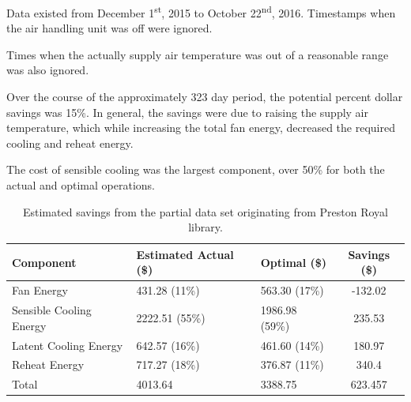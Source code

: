 Data existed from December 1\textsuperscript{st}, 2015 to October
22\textsuperscript{nd}, 2016. Timestamps when the air handling unit was
off were ignored. 

Times when the actually supply air temperature was out of a reasonable
range was also ignored. 

Over the course of the approximately 323 day period, the potential
percent dollar savings was 15\%. In general, the savings were due to
raising the supply air temperature, which while increasing the total fan
energy, decreased the required cooling and reheat energy. 

The cost of sensible cooling was the largest component, over 50\% for
both the actual and optimal operations. 

\begin{table}
\centering
\caption{Estimated savings from the partial data set originating from Preston Royal library.}
\label{tab:prestonRoyalSavings}

\begin{tabular}{lllS}
\toprule
    Component               & { Estimated Actual (\$) } & { Optimal (\$) }     & { Savings (\$) } \\ \midrule
    Fan Energy              & \num{431.28} (11\%)       & \num{563.30} (17\%)  & -132.02          \\
    Sensible Cooling Energy & \num{2222.51} (55\%)      & \num{1986.98} (59\%) & 235.53           \\
    Latent Cooling Energy   & \num{642.57} (16\%)       & \num{461.60} (14\%)  & 180.97           \\
    Reheat Energy           & \num{717.27} (18\%)       & \num{376.87}  (11\%) & 340.4            \\ \midrule
    Total                   & \num{4013.64}             & \num{3388.75}        & 623.457          \\ \bottomrule
\end{tabular}

\end{table}



